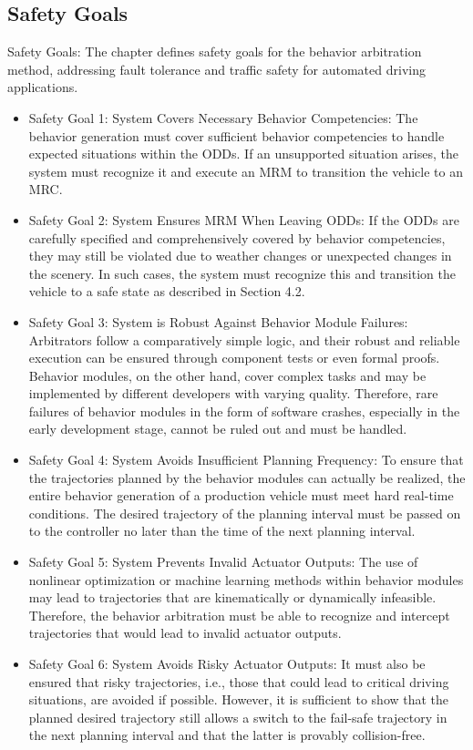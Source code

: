 \subsection{Safety Goals}

Safety Goals: The chapter defines safety goals for the behavior arbitration method, addressing fault tolerance and traffic safety for automated driving applications.

\begin{itemize}
    \item Safety Goal 1: System Covers Necessary Behavior Competencies: The behavior generation must cover sufficient behavior competencies to handle expected situations within the ODDs. If an unsupported situation arises, the system must recognize it and execute an MRM to transition the vehicle to an MRC.
    \item Safety Goal 2: System Ensures MRM When Leaving ODDs: If the ODDs are carefully specified and comprehensively covered by behavior competencies, they may still be violated due to weather changes or unexpected changes in the scenery. In such cases, the system must recognize this and transition the vehicle to a safe state as described in Section 4.2.
    \item Safety Goal 3: System is Robust Against Behavior Module Failures: Arbitrators follow a comparatively simple logic, and their robust and reliable execution can be ensured through component tests or even formal proofs. Behavior modules, on the other hand, cover complex tasks and may be implemented by different developers with varying quality. Therefore, rare failures of behavior modules in the form of software crashes, especially in the early development stage, cannot be ruled out and must be handled.
    \item Safety Goal 4: System Avoids Insufficient Planning Frequency: To ensure that the trajectories planned by the behavior modules can actually be realized, the entire behavior generation of a production vehicle must meet hard real-time conditions. The desired trajectory of the planning interval must be passed on to the controller no later than the time of the next planning interval.
    \item Safety Goal 5: System Prevents Invalid Actuator Outputs: The use of nonlinear optimization or machine learning methods within behavior modules may lead to trajectories that are kinematically or dynamically infeasible. Therefore, the behavior arbitration must be able to recognize and intercept trajectories that would lead to invalid actuator outputs.
    \item Safety Goal 6: System Avoids Risky Actuator Outputs: It must also be ensured that risky trajectories, i.e., those that could lead to critical driving situations, are avoided if possible. However, it is sufficient to show that the planned desired trajectory still allows a switch to the fail-safe trajectory in the next planning interval and that the latter is provably collision-free.
\end{itemize}

